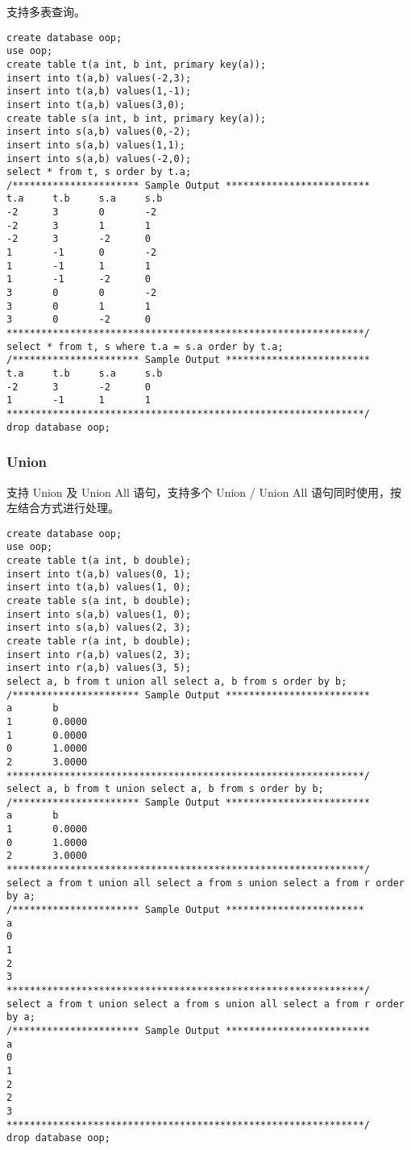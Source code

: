 \documentclass[12pt,a4paper]{article}
\begin{document}
支持多表查询。

\begin{lstlisting}
create database oop;
use oop;
create table t(a int, b int, primary key(a));
insert into t(a,b) values(-2,3);
insert into t(a,b) values(1,-1);
insert into t(a,b) values(3,0);
create table s(a int, b int, primary key(a));
insert into s(a,b) values(0,-2);
insert into s(a,b) values(1,1);
insert into s(a,b) values(-2,0);
select * from t, s order by t.a; 
/********************** Sample Output *************************
t.a     t.b     s.a     s.b     
-2      3       0       -2      
-2      3       1       1       
-2      3       -2      0       
1       -1      0       -2      
1       -1      1       1       
1       -1      -2      0       
3       0       0       -2      
3       0       1       1       
3       0       -2      0     
**************************************************************/
select * from t, s where t.a = s.a order by t.a; 
/********************** Sample Output *************************
t.a     t.b     s.a     s.b     
-2      3       -2      0       
1       -1      1       1   
**************************************************************/
drop database oop; 
\end{lstlisting}

\subsubsection{Union}

支持 Union 及 Union All 语句，支持多个 Union / Union All 语句同时使用，按左结合方式进行处理。

\begin{lstlisting}
create database oop;
use oop;
create table t(a int, b double); 
insert into t(a,b) values(0, 1); 
insert into t(a,b) values(1, 0); 
create table s(a int, b double); 
insert into s(a,b) values(1, 0); 
insert into s(a,b) values(2, 3); 
create table r(a int, b double); 
insert into r(a,b) values(2, 3); 
insert into r(a,b) values(3, 5); 
select a, b from t union all select a, b from s order by b; 
/********************** Sample Output *************************
a       b       
1       0.0000  
1       0.0000  
0       1.0000  
2       3.0000  
**************************************************************/
select a, b from t union select a, b from s order by b; 
/********************** Sample Output *************************
a       b       
1       0.0000  
0       1.0000  
2       3.0000 
**************************************************************/
select a from t union all select a from s union select a from r order by a; 
/********************** Sample Output ************************
a       
0       
1       
2       
3   
**************************************************************/
select a from t union select a from s union all select a from r order by a; 
/********************** Sample Output *************************
a       
0       
1       
2       
2       
3     
**************************************************************/
drop database oop;
\end{lstlisting}
\end{document}
